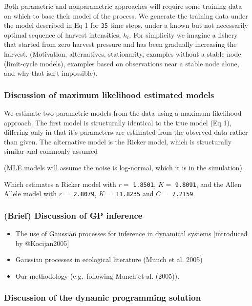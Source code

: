 \documentclass[author-year, review]{elsarticle} %
\begin{document}
Both parametric and nonparametric approaches will require some training
data on which to base their model of the process. We generate the
training data under the model described in Eq 1 for \texttt{35} time
steps, under a known but not necessarily optimal sequence of harvest
intensities, $h_t$. For simplicity we imagine a fishery that started
from zero harvest pressure and has been gradually increasing the
harvest. (Motivation, alternatives, stationarity, examples without a
stable node (limit-cycle models), examples based on observations near a
stable node alone, and why that isn't impossible).

\subsubsection{Discussion of maximum likelihood estimated models}

We estimate two parametric models from the data using a maximum
likelihood approach. The first model is structurally identical to the
true model (Eq 1), differing only in that it's parameters are estimated
from the observed data rather than given. The alternative model is the
Ricker model, which is structurally similar and commonly assumed

(MLE models will assume the noise is log-normal, which it is in the
simulation).

Which estimates a Ricker model with $r =$ \texttt{1.8501}, $K =$
\texttt{9.8091}, and the Allen Allele model with $r =$ \texttt{2.8079},
$K =$ \texttt{11.8235} and $C =$ \texttt{7.2159}.

\subsubsection{(Brief) Discussion of GP inference}

\begin{itemize}
\item
  The use of Gaussian processes for inference in dynamical systems
  {[}introduced by @Kocijan2005{]}
\item
  Gaussian processes in ecological literature (Munch et al. 2005)
\item
  Our methodology (e.g.~following Munch et al. (2005)).
\end{itemize}

\subsubsection{Discussion of the dynamic programming solution}
\end{document}
